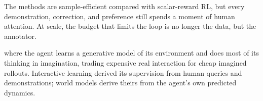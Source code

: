 \vspace{2.5em}


The methods are sample-efficient compared with scalar-reward RL,
but every demonstration, correction, and preference still spends a moment of human attention.
At scale, the budget that limits the loop is no longer the data, but the annotator.

where the agent learns a generative model of its environment and does most of its thinking in imagination,
trading expensive real interaction for cheap imagined rollouts.
Interactive learning derived its supervision from human queries and demonstrations;
world models derive theirs from the agent's own predicted dynamics.

